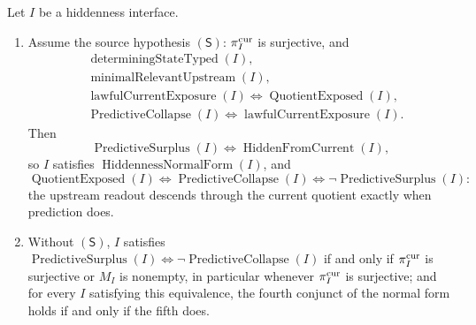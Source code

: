 \begin{theorem}\label{thm:F13a}
Let \(I\) be a hiddenness interface.
\begin{enumerate}[label=(\roman*)]
\item Assume the source hypothesis
  \((\mathsf S)\): \(\pi^{\mathrm{cur}}_I\) is surjective, and
  \begin{align*}
    &\operatorname{determiningStateTyped}(I),\\
    &\operatorname{minimalRelevantUpstream}(I),\\
    &\operatorname{lawfulCurrentExposure}(I)
      \iff \operatorname{QuotientExposed}(I),\\
    &\operatorname{PredictiveCollapse}(I)
      \iff \operatorname{lawfulCurrentExposure}(I).
  \end{align*}
  Then
  \[
    \operatorname{PredictiveSurplus}(I)
      \iff \operatorname{HiddenFromCurrent}(I),
  \]
  so \(I\) satisfies \(\operatorname{HiddennessNormalForm}(I)\), and
  \[
    \operatorname{QuotientExposed}(I)\iff
    \operatorname{PredictiveCollapse}(I)\iff
    \neg\operatorname{PredictiveSurplus}(I):
  \]
  the upstream readout descends through the current quotient exactly
  when prediction does.
\item Without \((\mathsf S)\), \(I\) satisfies
  \(\operatorname{PredictiveSurplus}(I)\iff\neg\operatorname{PredictiveCollapse}(I)\)
  if and only if \(\pi^{\mathrm{cur}}_I\) is surjective or \(M_I\) is nonempty, in
  particular whenever \(\pi^{\mathrm{cur}}_I\) is surjective; and for every \(I\)
  satisfying this equivalence, the fourth conjunct of the normal form
  holds if and only if the fifth does.
\end{enumerate}
\end{theorem}

